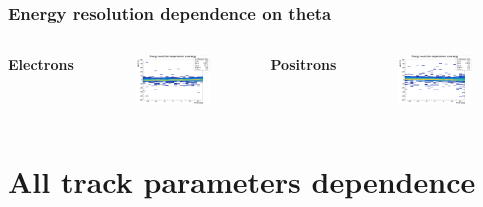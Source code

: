 \documentclass{beamer}
\begin{document}
		\begin{frame}
			\frametitle{Energy resolution dependence on theta}
			\begin{columns}
				\centering
				\Large \textbf{Electrons}
				\begin{figure}
					\centering
					\includegraphics[width = 0.95 \linewidth]{images/c_e_deltaenergy_theta.png}
				\end{figure}
				\centering
				\Large \textbf{Positrons}
				\begin{figure}
					\centering
					\includegraphics[width = 0.95 \linewidth]{images/c_p_deltaenergy_theta.png}
				\end{figure}
			\end{columns}
		\end{frame}
	
	\section{All track parameters dependence}
	
\end{document}
